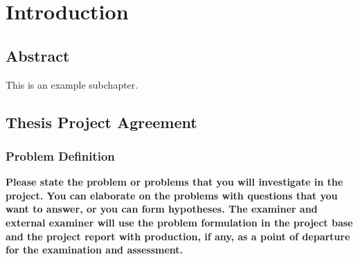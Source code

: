 \chapter{Introduction}

\section{Abstract}
This is an example subchapter.

\section{Thesis Project Agreement}

\subsection{Problem Definition} %

\textbf{Please state the problem or problems that you will investigate in the project. You can elaborate on the problems with questions that you want to answer, or you can form hypotheses. The examiner and external examiner will use the problem formulation in the project base and the project report with production, if any, as a point of departure for the examination and assessment.}

